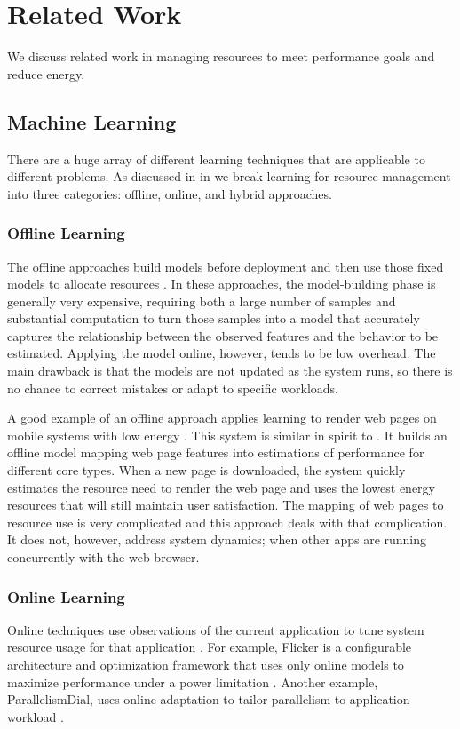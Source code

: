 \section{Related Work}

We discuss related work in managing resources to meet performance
goals and reduce energy.  

\subsection{Machine Learning}
There are a huge array of different learning techniques that are
applicable to different problems.  As discussed in in 
we break learning for resource management into three categories:
offline, online, and hybrid approaches.  

\subsubsection{Offline Learning}
The offline approaches build models before deployment and then use
those fixed models to allocate resources
\cite{Yi2003,LeeBrooks2006,CPR,ChenJohn2011,petabricksStatic}.  In
these approaches, the model-building phase is generally very expensive,
requiring both a large number of samples and substantial computation
to turn those samples into a model that accurately captures the
relationship between the observed features and the behavior to be
estimated.  Applying the model online, however, tends to be low
overhead.  The main drawback is that the models are not updated as the
system runs, so there is no chance to correct mistakes or adapt to
specific workloads.

A good example of an offline approach applies learning to render web
pages on mobile systems with low energy \cite{reddiHPCA2013}.  This
system is similar in spirit to \SYSTEM{}.  It builds an offline model
mapping web page features into estimations of performance for
different core types.  When a new page is downloaded, the system
quickly estimates the resource need to render the web page and uses the
lowest energy resources that will still maintain user satisfaction.
The mapping of web pages to resource use is very complicated and this
approach deals with that complication.  It does not, however, address
system dynamics; \eg{} when other apps are running concurrently with the
web browser.

\subsubsection{Online Learning}
Online techniques use observations of the current application to tune
system resource usage for that application
\cite{Li2006,Flicker,ParallelismDial,Ponamarev,petabricksDynamic,LeeBrooks}.
For example, Flicker is a configurable architecture and optimization
framework that uses only online models to maximize performance under a
power limitation \cite{Flicker}.  Another example, ParallelismDial,
uses online adaptation to tailor parallelism to application workload
\cite{ParallelismDial}.



